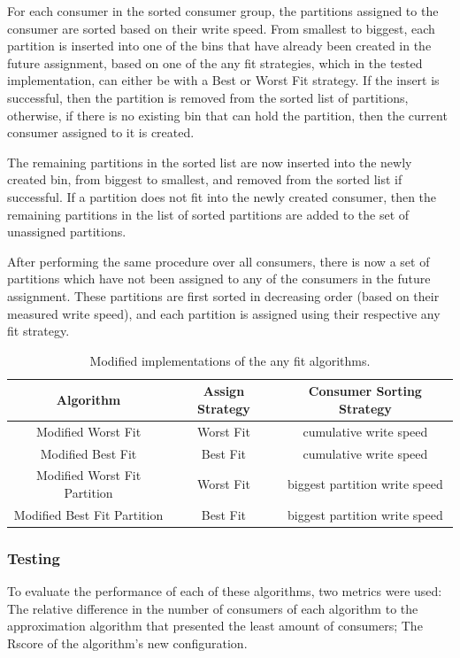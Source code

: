 For each consumer in the sorted consumer group, the partitions assigned to the consumer are sorted based on their write speed. From smallest to biggest, each partition is inserted into one of the bins that have already been created in the future assignment, based on one of the any fit strategies, which in the tested implementation, can either be with a Best or Worst Fit strategy. If the insert is successful, then the partition is removed from the sorted list of partitions, otherwise, if there is no existing bin that can hold the partition, then the current consumer assigned to it is created. 

The remaining partitions in the sorted list are now inserted into the newly created bin, from biggest to smallest, and removed from the sorted list if successful. If a partition does not fit into the newly created consumer, then the remaining partitions in the list of sorted partitions are added to the set of unassigned partitions.

After performing the same procedure over all consumers, there is now a set of partitions which have not been assigned to any of the consumers in the future assignment. These partitions are first sorted in decreasing order (based on their measured write speed), and each partition is assigned using their respective any fit strategy.

\begin{table}[H]
\centering
\caption{Modified implementations of the any fit algorithms.}
\begin{tabular}{ |c|c|c| } 
    \hline
    \textbf{Algorithm} & \textbf{Assign Strategy} & \textbf{Consumer Sorting Strategy} \\ 
    \hline
    Modified Worst Fit & Worst Fit & cumulative write speed \\
    Modified Best Fit & Best Fit & cumulative write speed \\ 
    Modified Worst Fit Partition  & Worst Fit & biggest partition write speed \\ 
    Modified Best Fit Partition &  Best Fit & biggest partition write speed \\
    \hline
\end{tabular}
\end{table}

\subsubsection{Testing}
\label{c3subsub:testing}

To evaluate the performance of each of these algorithms, two metrics were used: The relative difference in the number of consumers of each algorithm to the approximation algorithm that presented the least amount of consumers; The Rscore of the algorithm's new configuration.

